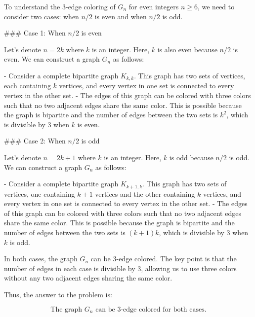 To understand the 3-edge coloring of \(G_n\) for even integers \(n \geq 6\), we need to consider two cases: when \(n/2\) is even and when \(n/2\) is odd.

### Case 1: When \(n/2\) is even

Let's denote \(n = 2k\) where \(k\) is an integer. Here, \(k\) is also even because \(n/2\) is even. We can construct a graph \(G_n\) as follows:

- Consider a complete bipartite graph \(K_{k,k}\). This graph has two sets of vertices, each containing \(k\) vertices, and every vertex in one set is connected to every vertex in the other set.
- The edges of this graph can be colored with three colors such that no two adjacent edges share the same color. This is possible because the graph is bipartite and the number of edges between the two sets is \(k^2\), which is divisible by 3 when \(k\) is even.

### Case 2: When \(n/2\) is odd

Let's denote \(n = 2k+1\) where \(k\) is an integer. Here, \(k\) is odd because \(n/2\) is odd. We can construct a graph \(G_n\) as follows:

- Consider a complete bipartite graph \(K_{k+1,k}\). This graph has two sets of vertices, one containing \(k+1\) vertices and the other containing \(k\) vertices, and every vertex in one set is connected to every vertex in the other set.
- The edges of this graph can be colored with three colors such that no two adjacent edges share the same color. This is possible because the graph is bipartite and the number of edges between the two sets is \((k+1)k\), which is divisible by 3 when \(k\) is odd.

In both cases, the graph \(G_n\) can be 3-edge colored. The key point is that the number of edges in each case is divisible by 3, allowing us to use three colors without any two adjacent edges sharing the same color.

Thus, the answer to the problem is:

\[
\boxed{\text{The graph } G_n \text{ can be 3-edge colored for both cases.}}
\]